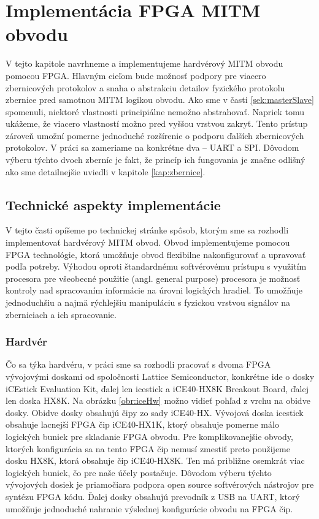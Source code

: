 \chapter{Implementácia FPGA MITM obvodu}
\label{kap:implementacia}

V tejto kapitole navrhneme a implementujeme hardvérový MITM obvodu pomocou FPGA. Hlavným cieľom bude možnosť podpory pre viacero zbernicových protokolov a snaha o abstrakciu detailov fyzického protokolu zbernice pred samotnou MITM logikou obvodu. Ako sme v časti \ref{sek:masterSlave} spomenuli, niektoré vlastnosti principiálne nemožno abstrahovať. Napriek tomu ukážeme, že viacero vlastností možno pred vyššou vrstvou zakryť. Tento prístup zároveň umožní pomerne jednoduché rozšírenie o podporu ďalších zbernicových protokolov. V práci sa zameriame na konkrétne dva -- UART a SPI. Dôvodom výberu týchto dvoch zberníc je fakt, že princíp ich fungovania je značne odlišný ako sme detailnejšie uviedli v kapitole \ref{kap:zbernice}.

\section{Technické aspekty implementácie}
V tejto časti opíšeme po technickej stránke spôsob, ktorým sme sa rozhodli implementovať hardvérový MITM obvod. Obvod implementujeme pomocou FPGA technológie, ktorá umožňuje obvod flexibilne nakonfigurovať a upravovať podľa potreby. Výhodou oproti štandardnému softvérovému prístupu s využitím procesora pre všeobecné použitie (angl. general purpose) procesora je možnosť kontroly nad spracovaním informácie na úrovni logických hradiel. To umožňuje jednoduchšiu a najmä rýchlejšiu manipuláciu s fyzickou vrstvou signálov na zberniciach a ich spracovanie.

\subsection{Hardvér}
Čo sa týka hardvéru, v práci sme sa rozhodli pracovať s dvoma FPGA vývojovými doskami od spoločnosti Lattice Semiconductor, konkrétne ide o dosky iCEstick Evaluation Kit, ďalej len icestick a iCE40-HX8K Breakout Board, ďalej len doska HX8K. Na obrázku \ref{obr:iceHw} možno vidieť pohľad z vrchu na obidve dosky. Obidve dosky obsahujú čipy zo sady iCE40-HX. Vývojová doska icestick obsahuje lacnejší FPGA čip iCE40-HX1K, ktorý obsahuje pomerne málo logických buniek pre skladanie FPGA obvodu. Pre komplikovanejšie obvody, ktorých konfigurácia sa na tento FPGA čip nemusí zmestiť preto použijeme dosku HX8K, ktorá obsahuje čip iCE40-HX8K. Ten má približne osemkrát viac logických buniek, čo pre naše účely postačuje. Dôvodom výberu týchto vývojových dosiek je priamočiara podpora open source softvérových nástrojov pre syntézu FPGA kódu. Ďalej dosky obsahujú prevodník z USB na UART, ktorý umožňuje jednoduché nahranie výslednej konfigurácie obvodu na FPGA čip.

